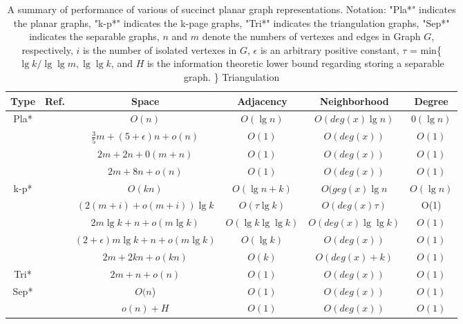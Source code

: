 \documentclass[12pt,glossary]{dalthesis}
\begin{document}
\bigskip

\begin{table}[ht]
\centering
\caption{A summary of performance of various of succinct planar graph representations. Notation: "Pla*" indicates the planar graphs, "k-p*" indicates the k-page graphs, "Tri*" indicates the triangulation graphs, "Sep*" indicates the separable graphs, $n$ and $m$ denote the numbers of vertexes and edges in Graph $G$, respectively, $i$ is the number of isolated vertexes in $G$, $\epsilon$ is an arbitrary positive constant, $\tau$ = min\{ $\lg k / \lg \lg m, \lg \lg k$, and $H$ is the information theoretic lower bound regarding storing a separable graph. \}  Triangulation}
\label{my-label}
\begin{tabular}{|c|c|c|c|c|c|}
\hline
Type                       & Ref. & Space & Adjacency & Neighborhood & Degree \\ \hline
\multirow{4}{*}{Pla*}    &  ~\cite{Jacobson}    & $O(n)$ &   $O(\lg n)$   &       $O(deg(x) \lg n)$       &    $0(\lg n)$    \\ \cline{2-6} 
                           &   ~\cite{Chuang} &  $\frac{3}{5} m + (5+ \epsilon )n + o(n) $  & $O(1)$  & $O(deg(x))$ &   $O(1)$     \\ \cline{2-6} 
                           & ~\cite{Chiang} & $2m+2n+0(m+n)$& $O(1)$  &  $O(deg(x))$  &  $O(1)$     \\ \cline{2-6} 
                           & ~\cite{Munro} & $2m+8n+o(n)$&  $O(1)$  &  $O(deg(x))$  &   $O(1)$  \\ \hline
\multirow{5}{*}{k-p*}    &  ~\cite{Jacobson} &  $O(kn)$  & $O(\lg n + k)$  &  $O(geg(x)\lg n$  &  $O(\lg n)$ \\ \cline{2-6} 
                           &   ~\cite{Gavoille}   & $(2(m+i)+o(m+i))\lg k$ & $O(\tau \lg k)$  &  $O(deg(x) \tau)$ & O(1) \\ \cline{2-6} 
                           &  ~\cite{Barbay} & $2m \lg k+n+o(m \lg k)$  & $O(\lg k \lg \lg k)$  & $O(deg(x) \lg \lg k)$ &   $O(1)$  \\ \cline{2-6} 
                           &   ~\cite{Barbay}   & $(2+\epsilon )m\lg k+n+o(m\lg k)$ & $O(\lg k)$ & $O(deg(x))$& $O(1)$        \\ \cline{2-6} 
                           &~\cite{Munro} & $2m+2kn+o(kn)$ & $O(k)$  & $O(deg(x)+k)$ &  $O(1)$  \\ \hline
\multirow{1}{*}{Tri*} &  ~\cite{Chuang}    & $2m+n+o(n)$  & $O(1)$      & $O(deg(x))$    & $O(1)$   \\ \hline
                           
\multirow{2}{*}{Sep*} &  ~\cite{compact-representation}    & $O(n$)  & $O(1)$      & $O(deg(x))$    & $O(1)$   \\ \cline{2-6} 
                           &  ~\cite{succinct-representation}    &  $o(n)+H$     & $O(1)$      & $O(deg(x))$    & $O(1)$   \\ \hline
\end{tabular}
\end{table}
\end{document}
